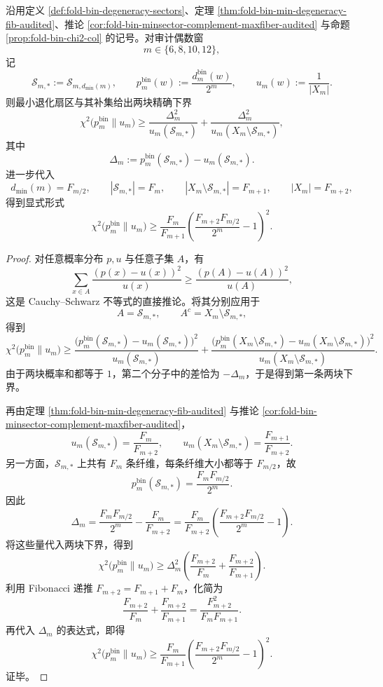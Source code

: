 \begin{theorem}\label{thm:derived-binfold-minsector-chi2-two-block-bound}
沿用定义 \ref{def:fold-bin-degeneracy-sectors}、定理 \ref{thm:fold-bin-min-degeneracy-fib-audited}、推论 \ref{cor:fold-bin-minsector-complement-maxfiber-audited} 与命题 \ref{prop:fold-bin-chi2-col} 的记号。对审计偶数窗
\[
m\in\{6,8,10,12\},
\]
记
\[
\mathcal S_{m,*}:=\mathcal S_{m,d_{\min}(m)},
\qquad
p_m^{\mathrm{bin}}(w):=\frac{d_m^{\mathrm{bin}}(w)}{2^m},
\qquad
u_m(w):=\frac{1}{|X_m|}.
\]
则最小退化扇区与其补集给出两块精确下界
\[
\chi^2\!\bigl(p_m^{\mathrm{bin}}\|u_m\bigr)
\ge
\frac{\Delta_m^2}{u_m(\mathcal S_{m,*})}
+
\frac{\Delta_m^2}{u_m(X_m\setminus \mathcal S_{m,*})},
\]
其中
\[
\Delta_m:=p_m^{\mathrm{bin}}(\mathcal S_{m,*})-u_m(\mathcal S_{m,*}).
\]
进一步代入
\[
d_{\min}(m)=F_{m/2},
\qquad
|\mathcal S_{m,*}|=F_m,
\qquad
|X_m\setminus \mathcal S_{m,*}|=F_{m+1},
\qquad
|X_m|=F_{m+2},
\]
得到显式形式
\[
\chi^2\!\bigl(p_m^{\mathrm{bin}}\|u_m\bigr)
\ge
\frac{F_m}{F_{m+1}}
\left(
\frac{F_{m+2}F_{m/2}}{2^m}-1
\right)^2.
\]
\end{theorem}
\begin{proof}
对任意概率分布 \(p,u\) 与任意子集 \(A\)，有
\[
\sum_{x\in A}\frac{(p(x)-u(x))^2}{u(x)}
\ge
\frac{(p(A)-u(A))^2}{u(A)},
\]
这是 Cauchy--Schwarz 不等式的直接推论。将其分别应用于
\[
A=\mathcal S_{m,*},
\qquad
A^c=X_m\setminus \mathcal S_{m,*},
\]
得到
\[
\chi^2\!\bigl(p_m^{\mathrm{bin}}\|u_m\bigr)
\ge
\frac{\bigl(p_m^{\mathrm{bin}}(\mathcal S_{m,*})-u_m(\mathcal S_{m,*})\bigr)^2}{u_m(\mathcal S_{m,*})}
+
\frac{\bigl(p_m^{\mathrm{bin}}(X_m\setminus \mathcal S_{m,*})-u_m(X_m\setminus \mathcal S_{m,*})\bigr)^2}{u_m(X_m\setminus \mathcal S_{m,*})}.
\]
由于两块概率和都等于 \(1\)，第二个分子中的差恰为 \(-\Delta_m\)，于是得到第一条两块下界。

再由定理 \ref{thm:fold-bin-min-degeneracy-fib-audited} 与推论 \ref{cor:fold-bin-minsector-complement-maxfiber-audited}，
\[
u_m(\mathcal S_{m,*})=\frac{F_m}{F_{m+2}},
\qquad
u_m(X_m\setminus \mathcal S_{m,*})=\frac{F_{m+1}}{F_{m+2}}.
\]
另一方面，\(\mathcal S_{m,*}\) 上共有 \(F_m\) 条纤维，每条纤维大小都等于 \(F_{m/2}\)，故
\[
p_m^{\mathrm{bin}}(\mathcal S_{m,*})
=
\frac{F_mF_{m/2}}{2^m}.
\]
因此
\[
\Delta_m
=
\frac{F_mF_{m/2}}{2^m}-\frac{F_m}{F_{m+2}}
=
\frac{F_m}{F_{m+2}}
\left(
\frac{F_{m+2}F_{m/2}}{2^m}-1
\right).
\]
将这些量代入两块下界，得到
\[
\chi^2\!\bigl(p_m^{\mathrm{bin}}\|u_m\bigr)
\ge
\Delta_m^2
\left(
\frac{F_{m+2}}{F_m}+\frac{F_{m+2}}{F_{m+1}}
\right).
\]
利用 Fibonacci 递推 \(F_{m+2}=F_{m+1}+F_m\)，化简为
\[
\frac{F_{m+2}}{F_m}+\frac{F_{m+2}}{F_{m+1}}
=
\frac{F_{m+2}^2}{F_mF_{m+1}}.
\]
再代入 \(\Delta_m\) 的表达式，即得
\[
\chi^2\!\bigl(p_m^{\mathrm{bin}}\|u_m\bigr)
\ge
\frac{F_m}{F_{m+1}}
\left(
\frac{F_{m+2}F_{m/2}}{2^m}-1
\right)^2.
\]
证毕。
\end{proof}

